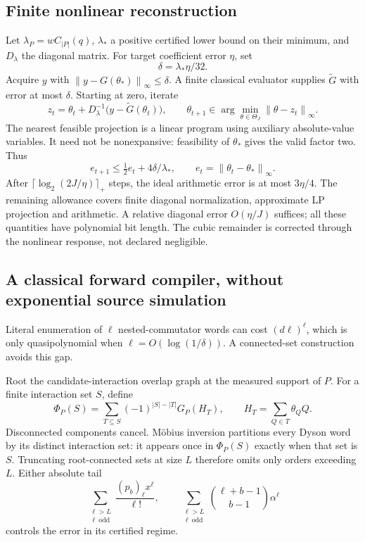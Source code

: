 \documentclass[11pt]{article}
\newcommand{\norm}[1]{\left\lVert #1\right\rVert}
\begin{document}
\subsection{Finite nonlinear reconstruction}
Let \(\lambda_P=wC_{|P|}(q)\), \(\lambda_*\) a positive certified lower bound on their minimum, and \(D_\lambda\) the diagonal matrix. For target coefficient error \(\eta\), set
\[
 \delta=\lambda_*\eta/32.
\]
Acquire \(y\) with \(\norm{y-G(\theta_*)}_\infty\le\delta\). A finite classical evaluator supplies \(\widetilde G\) with error at most \(\delta\). Starting at zero, iterate
\[
 z_t=\theta_t+D_\lambda^{-1}\bigl(y-\widetilde G(\theta_t)\bigr),
 \qquad\theta_{t+1}\in\arg\min_{\theta\in\Theta_J}\norm{\theta-z_t}_\infty.
\]
The nearest feasible projection is a linear program using auxiliary absolute-value variables. It need not be nonexpansive: feasibility of \(\theta_*\) gives the valid factor two. Thus
\[
 e_{t+1}\le\tfrac12e_t+4\delta/\lambda_*,
 \qquad e_t=\norm{\theta_t-\theta_*}_\infty.
\]
After \(\lceil\log_2(2J/\eta)\rceil_+\) steps, the ideal arithmetic error is at most \(3\eta/4\). The remaining allowance covers finite diagonal normalization, approximate LP projection and arithmetic. A relative diagonal error \(O(\eta/J)\) suffices; all these quantities have polynomial bit length. The cubic remainder is corrected through the nonlinear response, not declared negligible.

\subsection{A classical forward compiler, without exponential source simulation}
Literal enumeration of \(\ell\) nested-commutator words can cost \((d\ell)^\ell\), which is only quasipolynomial when \(\ell=O(\log(1/\delta))\). A connected-set construction avoids this gap.

Root the candidate-interaction overlap graph at the measured support of \(P\). For a finite interaction set \(S\), define
\[
 \Phi_P(S)=\sum_{T\subseteq S}(-1)^{|S|-|T|}G_P(H_T),
 \qquad H_T=\sum_{Q\in T}\theta_QQ.
\]
Disconnected components cancel. M\"obius inversion partitions every Dyson word by its distinct interaction set: it appears once in \(\Phi_P(S)\) exactly when that set is \(S\). Truncating root-connected sets at size \(L\) therefore omits only orders exceeding \(L\). Either absolute tail
\[
 \sum_{\substack{\ell>L\\\ell\ \mathrm{odd}}}
 \frac{(p_b)_\ell x^\ell}{\ell!},\qquad
 \sum_{\substack{\ell>L\\\ell\ \mathrm{odd}}}
 {\ell+b-1\choose b-1}\alpha^\ell
\]
controls the error in its certified regime.
\end{document}
